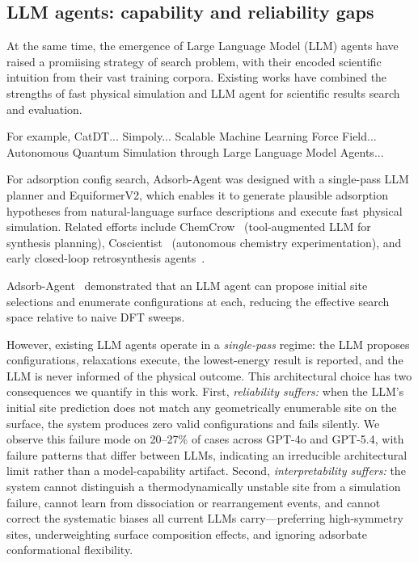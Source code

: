 \subsection{LLM agents: capability and reliability gaps}
At the same time, the emergence of Large Language Model (LLM) agents have raised a promiising strategy of search problem, with their encoded scientific intuition from their vast training corpora.
Existing works have combined the strengths of fast physical simulation and LLM agent for  scientific results search and evaluation. 

For example, CatDT...
Simpoly...
Scalable Machine Learning Force Field...
Autonomous Quantum Simulation through Large Language Model Agents...


For adsorption config search, Adsorb-Agent was designed with a single-pass LLM planner and EquiformerV2, which enables it to generate plausible adsorption hypotheses from natural-language surface descriptions and execute fast physical simulation.
Related efforts include ChemCrow~\cite{bran2024chemcrow} (tool-augmented LLM for synthesis planning), Coscientist~\cite{boiko2023autonomous} (autonomous chemistry experimentation), and early closed-loop retrosynthesis agents~\cite{schwaller2020predicting}.

Adsorb-Agent~\cite{ock2024adsorbagent} demonstrated that an LLM agent can propose initial site selections and enumerate configurations at each, reducing the effective search space relative to naive DFT sweeps.

However, existing LLM agents operate in a \textit{single-pass} regime: the LLM proposes configurations, relaxations execute, the lowest-energy result is reported, and the LLM is never informed of the physical outcome.
This architectural choice has two consequences we quantify in this work.
First, \textit{reliability suffers:} when the LLM's initial site prediction does not match any geometrically enumerable site on the surface, the system produces zero valid configurations and fails silently. We observe this failure mode on 20--27\% of cases across GPT-4o and GPT-5.4, with failure patterns that differ between LLMs, indicating an irreducible architectural limit rather than a model-capability artifact.
Second, \textit{interpretability suffers:} the system cannot distinguish a thermodynamically unstable site from a simulation failure, cannot learn from dissociation or rearrangement events, and cannot correct the systematic biases all current LLMs carry---preferring high-symmetry sites, underweighting surface composition effects, and ignoring adsorbate conformational flexibility.


